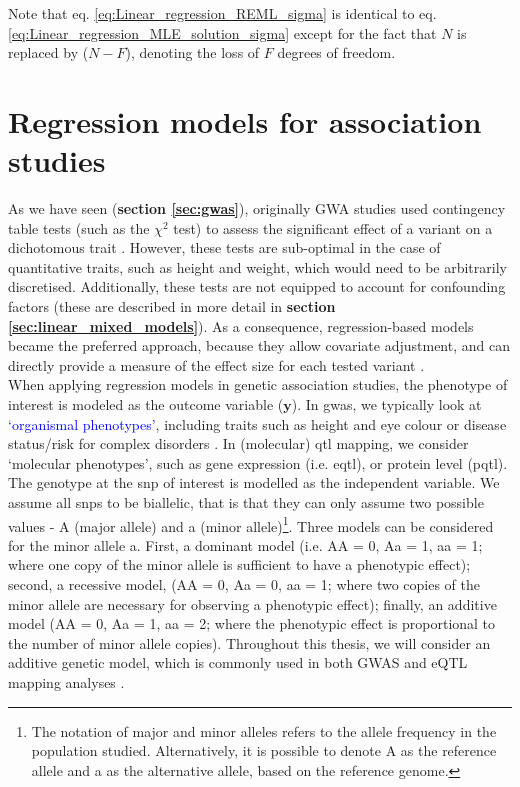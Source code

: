Note that eq. \eqref{eq:Linear_regression_REML_sigma} is identical to eq. \eqref{eq:Linear_regression_MLE_solution_sigma} except for the fact that $N$ is replaced by ($N-F$), denoting the loss of $F$ degrees of freedom.

\newpage


\section{Regression models for association studies}
\label{sec:linear_models_genetics}

As we have seen (\textbf{section \ref{sec:gwas}}), originally GWA studies used contingency table tests (such as the $\chi^2$ test) to assess the significant effect of a variant on a dichotomous trait \cite{mccarthy2008genome}.
However, these tests are sub-optimal in the case of quantitative traits, such as height and weight, which would need to be arbitrarily discretised.
Additionally, these tests are not equipped to account for confounding factors (these are described in more detail in \textbf{section \ref{sec:linear_mixed_models}}).
As a consequence, regression-based models became the preferred approach, because they allow covariate adjustment, and can directly provide a measure of the effect size for each tested variant \cite{bush2012genome}.\\

When applying regression models in genetic association studies, the phenotype of interest is modeled as the outcome variable ($\mathbf{y}$). 
In \gls{gwas}, we typically look at \textcolor{blue}{`organismal phenotypes'}, including traits such as height and eye colour or disease status/risk for complex disorders \cite{mccarthy2008genome}.
In (molecular) \gls{qtl} mapping, we consider `molecular phenotypes', such as gene expression (i.e. e\gls{qtl}), or protein level (p\gls{qtl}).
\\

The genotype at the \gls{snp} of interest is modelled as the independent variable.
We assume all \gls{snp}s to be biallelic, that is that they can only assume two possible values - A (major allele) and a (minor allele)\footnote{The notation of major and minor alleles refers to the allele frequency in the population studied.
Alternatively, it is possible to denote A as the reference allele and a as the alternative allele, based on the reference genome.}. 
Three models can be considered for the minor allele a.
First, a dominant model (i.e. AA = 0, Aa = 1, aa = 1; where one copy of the minor allele is sufficient to have a phenotypic effect); second, a recessive model, (AA = 0, Aa = 0, aa = 1; where two copies of the minor allele are necessary for observing a phenotypic effect); finally, an additive model (AA = 0, Aa = 1, aa = 2; where the phenotypic effect is proportional to the number of minor allele copies). 
Throughout this thesis, we will consider an additive genetic model, which is commonly used in both GWAS and eQTL mapping analyses \cite{laird2010fundamentals}.
\\

